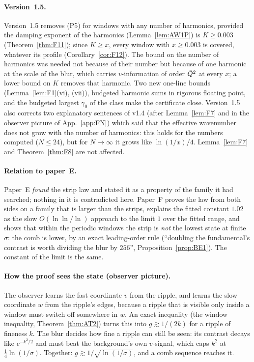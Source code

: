 \paragraph*{Version~1.5.}
Version~1.5 removes (P5) for windows with any number of harmonics, provided the damping exponent of the harmonics (Lemma~\ref{lem:AW1P}) is
$K\ge0.003$ (Theorem~\ref{thm:F11}); since $K\ge x$, every window with $x\ge0.003$ is covered, whatever its profile (Corollary~\ref{cor:F12}). The bound on the
number of harmonics was needed not because of their number but because of one harmonic at the scale of the blur, which carries $v$-information of order
$\bar Q^2$ at every $x$; a lower bound on $K$ removes that harmonic. Two new one-line bounds (Lemma~\ref{lem:F1}(vi), (vii)), budgeted harmonic sums in
rigorous floating point, and the budgeted largest $\gamma_0$ of the class make the certificate close. Version~1.5 also corrects two explanatory
sentences of v1.4 (after Lemma~\ref{lem:F7} and in the observer picture of App.~\ref{app:FN}) which said that the effective wavenumber does not grow with the
number of harmonics: this holds for the numbers computed ($N\le24$), but for $N\to\infty$ it grows like $\ln(1/x)/4$. Lemma~\ref{lem:F7} and
Theorem~\ref{thm:F8} are not affected.

\paragraph*{Relation to paper~E.}
Paper~E \emph{found} the strip law and stated it as a property of the family it had searched; nothing in it is contradicted here.
Paper~F proves the law from both sides on a family that is larger than the strips, explains the fitted constant $1.02$ as the slow
$O(\ln\ln/\ln)$ approach to the limit $1$ over the fitted range, and shows that within the periodic windows the strip is \emph{not} the
lowest state at finite $\sigma$: the comb is lower, by an exact leading-order rule (``doubling the fundamental's contrast is worth
dividing the blur by $256$'', Proposition~\ref{prop:BE1}). The constant of the limit is the same.

\paragraph*{How the proof sees the state (observer picture).}
The observer learns the fast coordinate $v$ from the ripple, and learns the slow coordinate $w$ from the ripple's edges, because a ripple
that is visible only inside a window must switch off somewhere in $w$. An exact inequality (the window inequality, Theorem~\ref{thm:AT2})
turns this into $g\gtrsim1/(2k)$ for a ripple of fineness $k$. The blur decides how fine a ripple can still be seen: its contrast
decays like $e^{-k^2/2}$ and must beat the background's own $v$-signal, which caps $k^2$ at $\tfrac14\ln(1/\sigma)$.
Together: $g\gtrsim1/\sqrt{\ln(1/\sigma)}$, and a comb sequence reaches it.

